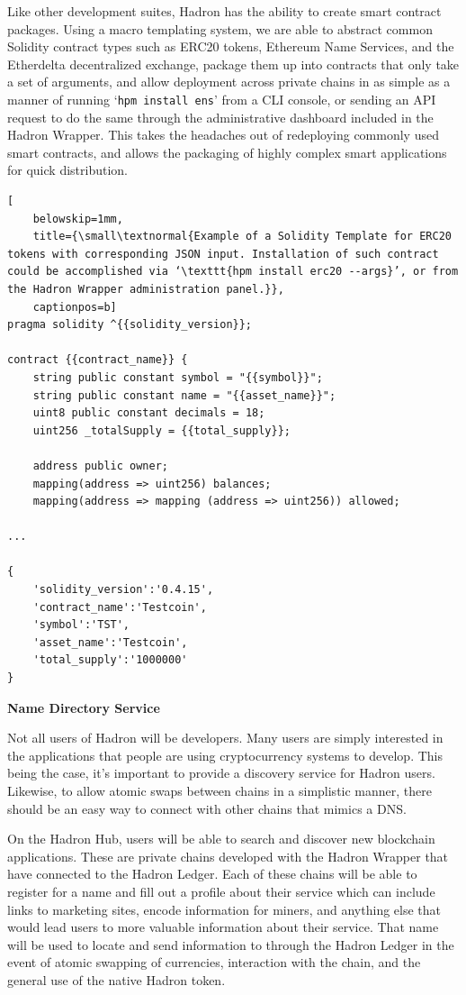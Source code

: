 \documentclass{%
	article}
\begin{document}
Like other development suites, Hadron has the ability to create smart contract packages. Using a macro templating system, we are able to abstract common Solidity contract types such as ERC20 tokens, Ethereum Name Services, and the Etherdelta decentralized exchange, package them up into contracts that only take a set of arguments, and allow deployment across private chains in as simple as a manner of running ‘\texttt{hpm install ens}’ from a CLI console, or sending an API request to do the same through the administrative dashboard included in the Hadron Wrapper. This takes the headaches out of redeploying commonly used smart contracts, and allows the packaging of highly complex smart applications for quick distribution.

\begin{lstlisting}[
	belowskip=1mm,
	title={\small\textnormal{Example of a Solidity Template for ERC20 tokens with corresponding JSON input. Installation of such contract could be accomplished via ‘\texttt{hpm install erc20 --args}’, or from the Hadron Wrapper administration panel.}},
	captionpos=b]
pragma solidity ^{{solidity_version}};

contract {{contract_name}} {
    string public constant symbol = "{{symbol}}";
    string public constant name = "{{asset_name}}";
    uint8 public constant decimals = 18;
    uint256 _totalSupply = {{total_supply}};

    address public owner;
    mapping(address => uint256) balances;
    mapping(address => mapping (address => uint256)) allowed;
    
...

{
    'solidity_version':'0.4.15',
    'contract_name':'Testcoin',
    'symbol':'TST',
    'asset_name':'Testcoin',
    'total_supply':'1000000'
}
\end{lstlisting}

\begin{center}
\textbf{Name Directory Service}
\end{center}

Not all users of Hadron will be developers. Many users are simply interested in the applications that people are using cryptocurrency systems to develop. This being the case, it’s important to provide a discovery service for Hadron users. Likewise, to allow atomic swaps between chains in a simplistic manner, there should be an easy way to connect with other chains that mimics a DNS.

On the Hadron Hub, users will be able to search and discover new blockchain applications. These are private chains developed with the Hadron Wrapper that have connected to the Hadron Ledger. Each of these chains will be able to register for a name and fill out a profile about their service which can include links to marketing sites, encode information for miners, and anything else that would lead users to more valuable information about their service. That name will be used to locate and send information to through the Hadron Ledger in the event of atomic swapping of currencies, interaction with the chain, and the general use of the native Hadron token.
\end{document}
